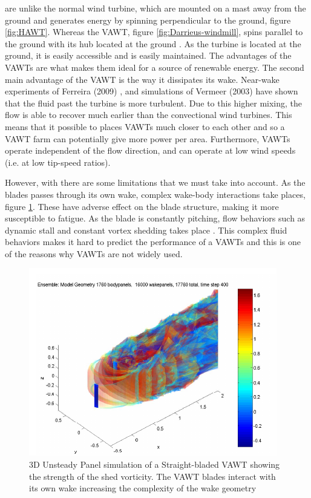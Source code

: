  are unlike the normal wind turbine, which are mounted on a mast away from the ground and generates energy by spinning perpendicular to the ground, figure \ref{fig:HAWT}. Whereas the VAWT, figure \ref{fig:Darrieus-windmill}, spins parallel to the ground with its hub located at the ground \cite{website:wikiVAWT}. As the turbine is located at the ground, it is easily accessible and is easily maintained. The advantages of the VAWTs are what makes them ideal for a source of renewable energy. The second main advantage of the VAWT is the way it dissipates its wake. Near-wake experiments of Ferreira (2009) \cite{Ferreira}, and simulations of Vermeer (2003) \cite{Vermeer2003} have shown that the fluid past the turbine is more turbulent. Due to this higher mixing, the flow is able to recover much earlier than the convectional wind turbines. This means that it possible to places VAWTs much closer to each other and so a VAWT farm can potentially give more power per area. Furthermore, VAWTs operate independent of the flow direction, and can operate at low wind speeds (i.e. at low tip-speed ratios).

However, with there are some limitations that we must take into account. As the blades passes through its own wake, complex wake-body interactions take places, figure \ref{fig:3DunsteadyPanelVAWT}. These have adverse effect on the blade structure, making it more susceptible to fatigue. As the blade is constantly pitching, flow behaviors such as dynamic stall and constant vortex shedding takes place \cite{SimaoFerreira2008}. This complex fluid behaviors makes it hard to predict the performance of a VAWTs and this is one of the reasons why VAWTs are not widely used. 

	\begin{figure}[!t]
		\centering
		\includegraphics[width=0.6\linewidth]{figures/introduction/3DunsteadyPanelVAWT.png}
		\caption{3D Unsteady Panel simulation of a Straight-bladed VAWT showing the strength of the shed vorticity. The VAWT blades interact with its own wake increasing the complexity of the wake geometry \cite{Dixon}}
		\label{fig:3DunsteadyPanelVAWT}
	\end{figure}

